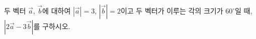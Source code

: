 두 벡터 $\vec{a}$, $\vec{b}$에 대하여 $|\vec{a}|=3$, $|\vec{b}|=2$이고 두 벡터가 이루는 각의 크기가 $60^\circ$일 때, $|2\vec{a}-3\vec{b}|$를 구하시오.

